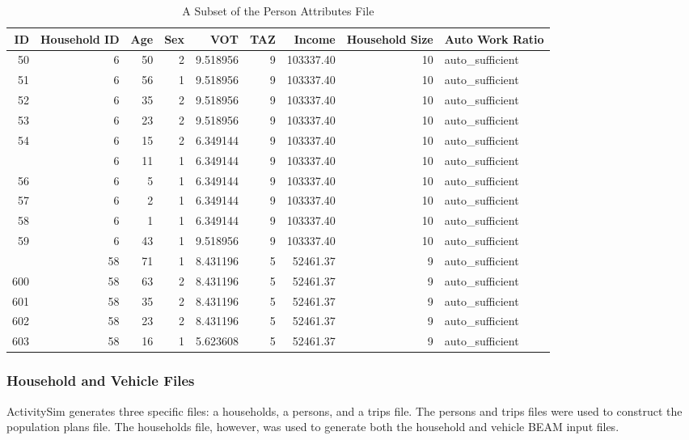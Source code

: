 \documentclass[12pt, oneside, openright]{byuthesis}
\begin{document}
\begin{table}

\caption{\label{tab:peratt}A Subset of the Person Attributes File}
\centering
\begin{tabular}[t]{rrrrrrrrl}
\toprule
ID & Household ID & Age & Sex & VOT & TAZ & Income & Household Size & Auto Work Ratio\\
\midrule
50 & 6 & 50 & 2 & 9.518956 & 9 & 103337.40 & 10 & auto\_sufficient\\
51 & 6 & 56 & 1 & 9.518956 & 9 & 103337.40 & 10 & auto\_sufficient\\
52 & 6 & 35 & 2 & 9.518956 & 9 & 103337.40 & 10 & auto\_sufficient\\
53 & 6 & 23 & 2 & 9.518956 & 9 & 103337.40 & 10 & auto\_sufficient\\
54 & 6 & 15 & 2 & 6.349144 & 9 & 103337.40 & 10 & auto\_sufficient\\
\addlinespace
55 & 6 & 11 & 1 & 6.349144 & 9 & 103337.40 & 10 & auto\_sufficient\\
56 & 6 & 5 & 1 & 6.349144 & 9 & 103337.40 & 10 & auto\_sufficient\\
57 & 6 & 2 & 1 & 6.349144 & 9 & 103337.40 & 10 & auto\_sufficient\\
58 & 6 & 1 & 1 & 6.349144 & 9 & 103337.40 & 10 & auto\_sufficient\\
59 & 6 & 43 & 1 & 9.518956 & 9 & 103337.40 & 10 & auto\_sufficient\\
\addlinespace
599 & 58 & 71 & 1 & 8.431196 & 5 & 52461.37 & 9 & auto\_sufficient\\
600 & 58 & 63 & 2 & 8.431196 & 5 & 52461.37 & 9 & auto\_sufficient\\
601 & 58 & 35 & 2 & 8.431196 & 5 & 52461.37 & 9 & auto\_sufficient\\
602 & 58 & 23 & 2 & 8.431196 & 5 & 52461.37 & 9 & auto\_sufficient\\
603 & 58 & 16 & 1 & 5.623608 & 5 & 52461.37 & 9 & auto\_sufficient\\
\bottomrule
\end{tabular}
\end{table}

\hypertarget{household-and-vehicle-files}{%
\subsubsection{Household and Vehicle Files}\label{household-and-vehicle-files}}

ActivitySim generates three specific files: a households, a persons, and a trips file. The persons and trips files were used to construct the population plans file. The households file, however, was used to generate both the household and vehicle BEAM input files.
\end{document}
